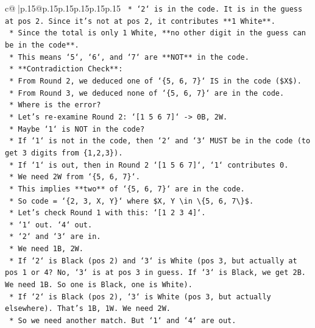 \documentclass{article}
\begin{document}
{\begin{supertabular}{c@{$\;$}|p{.15\linewidth}@{}p{.15\linewidth}p{.15\linewidth}p{.15\linewidth}p{.15\linewidth}p{.15\linewidth}}
{{{\texttt{        *   `2` is in the code. It is in the guess at pos 2. Since it's not at pos 2, it contributes **1 White**.} \\
\texttt{        *   Since the total is only 1 White, **no other digit in the guess can be in the code**.} \\
\texttt{        *   This means `5`, `6`, and `7` are **NOT** in the code.} \\
\texttt{    *   **Contradiction Check**:} \\
\texttt{        *   From Round 2, we deduced one of `\{5, 6, 7\}` IS in the code (\$X\$).} \\
\texttt{        *   From Round 3, we deduced none of `\{5, 6, 7\}` are in the code.} \\
\texttt{        *   Where is the error?} \\
\texttt{        *   Let's re{-}examine Round 2: `{[}1 5 6 7{]}` {-}> 0B, 2W.} \\
\texttt{            *   Maybe `1` is NOT in the code?} \\
\texttt{            *   If `1` is not in the code, then `2` and `3` MUST be in the code (to get 3 digits from \{1,2,3\}).} \\
\texttt{            *   If `1` is out, then in Round 2 `{[}1 5 6 7{]}`, `1` contributes 0.} \\
\texttt{            *   We need 2W from `\{5, 6, 7\}`.} \\
\texttt{            *   This implies **two** of `\{5, 6, 7\}` are in the code.} \\
\texttt{            *   So code = `\{2, 3, X, Y\}` where \$X, Y \textbackslash{}in \textbackslash{}\{5, 6, 7\textbackslash{}\}\$.} \\
\texttt{            *   Let's check Round 1 with this: `{[}1 2 3 4{]}`.} \\
\texttt{                *   `1` out. `4` out.} \\
\texttt{                *   `2` and `3` are in.} \\
\texttt{                *   We need 1B, 2W.} \\
\texttt{                *   If `2` is Black (pos 2) and `3` is White (pos 3, but actually at pos 1 or 4? No, `3` is at pos 3 in guess. If `3` is Black, we get 2B. We need 1B. So one is Black, one is White).} \\
\texttt{                *   If `2` is Black (pos 2), `3` is White (pos 3, but actually elsewhere). That's 1B, 1W. We need 2W.} \\
\texttt{                *   So we need another match. But `1` and `4` are out.} \\
}}}
\end{supertabular}}
\end{document}
